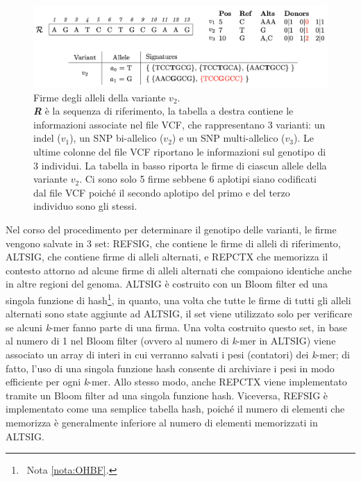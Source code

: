\documentclass[../main.tex]{subfiles}
\begin{document}
 \begin{figure}[h!]
	\centering
  	\captionsetup{justification=centering}
 	\includegraphics[scale=.65]{images/malva-sign.png}
  	\caption{Firme degli alleli della variante $v_{2}$.\\ \textit{\textbf{R}} è la sequenza di riferimento, la tabella a destra contiene le informazioni associate nel file VCF, che rappresentano 3 varianti: un indel ($v_{1}$), un SNP bi-allelico ($v_{2}$) e un SNP multi-allelico ($v_{3}$). Le ultime colonne del file VCF riportano le informazioni sul genotipo di 3 individui. La tabella in basso riporta le firme di ciascun allele della variante $v_{2}$. Ci sono solo 5 firme sebbene 6 aplotipi siano codificati dal file VCF poiché il secondo aplotipo del primo e del terzo individuo sono gli stessi.}
  	\label{fig:malvaSign}
\end{figure}


Nel corso del procedimento per determinare il genotipo delle varianti, le firme vengono salvate in 3 set: REFSIG, che contiene le firme di alleli di riferimento, ALTSIG, che contiene firme di alleli alternati, e REPCTX che memorizza il contesto attorno ad alcune firme di alleli alternati che compaiono identiche anche in altre regioni del genoma. ALTSIG è costruito con un Bloom filter ed una singola funzione di hash\footnote{\ Nota \vref{nota:OHBF}.}, in quanto, una volta che tutte le firme di tutti gli alleli alternati sono state aggiunte ad ALTSIG, il set viene utilizzato solo per verificare se alcuni \textit{k}-mer fanno parte di una firma. Una volta costruito questo set, in base al numero di 1 nel Bloom filter (ovvero al numero di \textit{k}-mer in ALTSIG) viene associato un array di interi in cui verranno salvati i pesi (contatori) dei \textit{k}-mer; di fatto, l'uso di una singola funzione hash consente di archiviare i pesi in modo efficiente per ogni \textit{k}-mer. Allo stesso modo, anche REPCTX viene implementato tramite un Bloom filter ad una singola funzione hash. Viceversa, REFSIG è implementato come una semplice tabella hash, poiché il numero di elementi che memorizza è generalmente inferiore al numero di elementi memorizzati in ALTSIG. 
\end{document}
